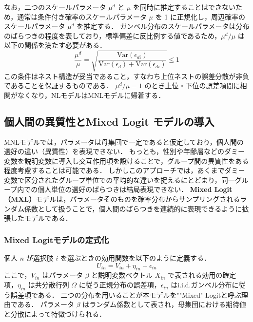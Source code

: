 なお，二つのスケールパラメータ $\mu^d$ と $\mu$ を同時に推定することはできないため，通常は条件付き確率のスケールパラメータ $\mu$ を 1 に正規化し，周辺確率のスケールパラメータ $\mu^d$ を推定する．
ガンベル分布のスケールパラメータは分布のばらつきの程度を表しており，標準偏差に反比例する値であるため，$\mu^d / \mu$ は以下の関係を満たす必要がある．
\begin{equation}
  \frac{\mu^d}{\mu} = \sqrt{\frac{\mathrm{Var}(\epsilon_{di})}{\mathrm{Var}(\epsilon_d) + \mathrm{Var}(\epsilon_{di})}} \leq 1
\end{equation}
この条件はネスト構造が妥当であること，すなわち上位ネストの誤差分散が非負であることを保証するものである．
$\mu^d / \mu = 1$ のとき上位・下位の誤差項間に相関がなくなり，NLモデルはMNLモデルに帰着する．




\subsection{個人間の異質性とMixed Logit モデルの導入}\label{ssec:mixed_logit}
MNLモデルでは，パラメータは母集団で一定であると仮定しており，個人間の選好の違い（異質性）を表現できない．
もっとも，性別や年齢層などのダミー変数を説明変数に導入し交互作用項を設けることで，グループ間の異質性をある程度考慮することは可能である．
しかしこのアプローチでは，あくまでダミー変数で区分されたグループ単位での平均的な違いを捉えるにとどまり，同一グループ内での個人単位の選好のばらつきは結局表現できない．
\textbf{Mixed Logit（MXL）}モデルは，パラメータそのものを確率分布からサンプリングされるランダム係数として扱うことで，個人間のばらつきを連続的に表現できるように拡張したモデルである．

\subsubsection{Mixed Logitモデルの定式化}
個人 $n$ が選択肢 $i$ を選ぶときの効用関数を以下のように定義する．
\begin{equation}
  U_{in} = V_{in} + \eta_{in} + \epsilon_{in}
\end{equation}
ここで，$V_{in}$ はパラメータ $\beta$ と説明変数ベクトル $X_{in}$ で表される効用の確定項，$\eta_{in}$ は共分散行列 $\Omega$ に従う正規分布の誤差項，$\epsilon_{in}$ はi.i.d.ガンベル分布に従う誤差項である．
二つの分布を用いることが本モデルを""Mixed" Logitと呼ぶ理由である．
パラメータ $\beta$ はランダム係数として表され，母集団における期待値と分散によって特徴づけられる．

